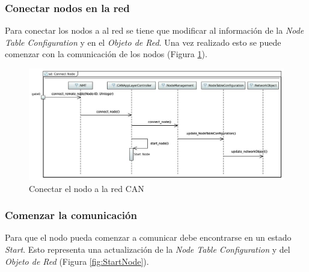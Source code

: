 \subsubsection{Conectar nodos en la red}
Para conectar los nodos a al red se tiene que modificar al información de la
\textit{Node Table Configuration} y en el \textit{Objeto de Red}. Una vez
realizado esto se puede comenzar con la comunicación de los nodos
(Figura \ref{fig:ConnectNode}).

\begin{figure}[h!]
 \centering
 \includegraphics[scale=0.4]{images/Secciones/AppendixA/connect_node.JPG}
  \caption{Conectar el nodo a la red CAN}
  \label{fig:ConnectNode}
\end{figure}

\subsubsection{Comenzar la comunicación}
Para que el nodo pueda comenzar a comunicar debe encontrarse en un estado
\textit{Start}. Esto representa una actualización de la
\textit{Node Table Configuration} y del \textit{Objeto de Red}
(Figura \ref{fig:StartNode}). 

